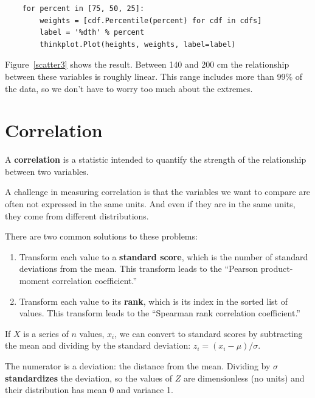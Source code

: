 \documentclass[12pt]{book}
\begin{document}
\begin{verbatim}
    for percent in [75, 50, 25]:
        weights = [cdf.Percentile(percent) for cdf in cdfs]
        label = '%dth' % percent
        thinkplot.Plot(heights, weights, label=label)
\end{verbatim}

Figure~\ref{scatter3} shows the result.  Between 140 and 200 cm
the relationship between these variables is roughly linear.  This range
includes more than 99\% of the data, so we don't have to worry
too much about the extremes.


\section{Correlation}

A {\bf correlation} is a statistic intended to quantify the strength
of the relationship between two variables.

A challenge in measuring correlation is that the variables we want to
compare are often not expressed in the same units.  And even if they
are in the same units, they come from different distributions.

There are two common solutions to these problems:

\begin{enumerate}

\item Transform each value to a {\bf standard score}, which is the
number of standard deviations from the mean.  
This transform leads to
the ``Pearson product-moment correlation coefficient.''

\item Transform each value to its {\bf rank}, which is its index in
the sorted list of values.  This transform
leads to the ``Spearman rank correlation coefficient.''

\end{enumerate}

If $X$ is a series of $n$ values, $x_i$, we can convert to standard
scores by subtracting the mean and dividing by the standard deviation:
$z_i = (x_i - \mu) / \sigma$.

The numerator is a deviation: the distance from the mean.  Dividing by
$\sigma$ {\bf standardizes} the deviation, so the values of $Z$ are
dimensionless (no units) and their distribution has mean 0 and
variance 1.
\end{document}
